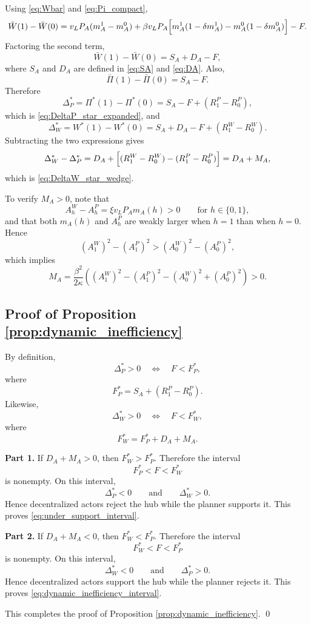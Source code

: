 Using \eqref{eq:Wbar} and \eqref{eq:Pi_compact},
\[
\bar W(1)-\bar W(0)
=
v_LP_A(m_A^1-m_A^0)
+
\beta v_LP_A\Bigl[m_A^1(1-\delta m_A^1)-m_A^0(1-\delta m_A^0)\Bigr]
-F.
\]
Factoring the second term,
\[
\bar W(1)-\bar W(0)=S_A+D_A-F,
\]
where $S_A$ and $D_A$ are defined in \eqref{eq:SA} and \eqref{eq:DA}. Also,
\[
\bar\Pi(1)-\bar\Pi(0)=S_A-F.
\]
Therefore
\[
\Delta_P^*=\Pi^*(1)-\Pi^*(0)=S_A-F+(R_1^P-R_0^P),
\]
which is \eqref{eq:DeltaP_star_expanded}, and
\[
\Delta_W^*=W^*(1)-W^*(0)=S_A+D_A-F+(R_1^W-R_0^W).
\]
Subtracting the two expressions gives
\[
\Delta_W^*-\Delta_P^*
=
D_A+\Bigl[(R_1^W-R_0^W)-(R_1^P-R_0^P)\Bigr]
=
D_A+M_A,
\]
which is \eqref{eq:DeltaW_star_wedge}.

To verify $M_A>0$, note that
\[
A_h^W-A_h^P=\xi v_LP_A m_A(h)>0
\qquad
\text{for } h\in\{0,1\},
\]
and that both $m_A(h)$ and $A_h^P$ are weakly larger when $h=1$ than when $h=0$. Hence
\[
(A_1^W)^2-(A_1^P)^2>(A_0^W)^2-(A_0^P)^2,
\]
which implies
\[
M_A
=
\frac{\beta^2}{2\kappa}
\left(
(A_1^W)^2-(A_1^P)^2-(A_0^W)^2+(A_0^P)^2
\right)
>0.
\]

\subsection{Proof of Proposition \ref{prop:dynamic_inefficiency}}

By definition,
\[
\Delta_P^*>0
\quad\Longleftrightarrow\quad
F<F_P^*,
\]
where
\[
F_P^*=S_A+(R_1^P-R_0^P).
\]
Likewise,
\[
\Delta_W^*>0
\quad\Longleftrightarrow\quad
F<F_W^*,
\]
where
\[
F_W^*=F_P^*+D_A+M_A.
\]

\noindent\textbf{Part 1.}
If $D_A+M_A>0$, then $F_W^*>F_P^*$. Therefore the interval
\[
F_P^*<F<F_W^*
\]
is nonempty. On this interval,
\[
\Delta_P^*<0
\qquad\text{and}\qquad
\Delta_W^*>0.
\]
Hence decentralized actors reject the hub while the planner supports it. This proves \eqref{eq:under_support_interval}.

\noindent\textbf{Part 2.}
If $D_A+M_A<0$, then $F_W^*<F_P^*$. Therefore the interval
\[
F_W^*<F<F_P^*
\]
is nonempty. On this interval,
\[
\Delta_W^*<0
\qquad\text{and}\qquad
\Delta_P^*>0.
\]
Hence decentralized actors support the hub while the planner rejects it. This proves \eqref{eq:dynamic_inefficiency_interval}.

This completes the proof of Proposition \ref{prop:dynamic_inefficiency}.
\qed
